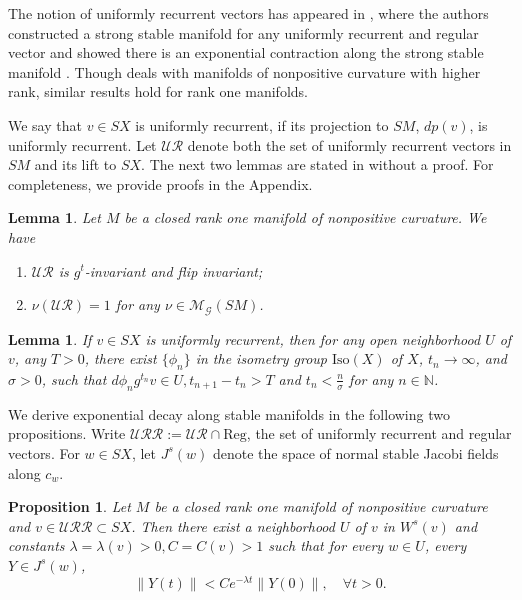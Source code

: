 \documentclass[11pt]{amsart}
\newtheorem{lemma}[theorem]{Lemma}
\newtheorem{proposition}[theorem]{Proposition}
\theoremstyle{definition}
\newcommand{\GGG}{\mathcal{G}}
\def\M{{\mathcal M}}
\newcommand{\UR}{\mathcal{UR}}
\newcommand{\URR}{\mathcal{URR}}
\def\NN{{\mathbb N}}
\begin{document}
The notion of uniformly recurrent vectors has appeared in \cite{BBE}, where the authors constructed a strong stable manifold for any uniformly recurrent and regular vector and showed there is an exponential contraction along the strong stable manifold \cite[Proposition 3.10]{BBE}. Though \cite{BBE} deals with manifolds of nonpositive curvature with higher rank, similar results hold for rank one manifolds.

We say that $v\in SX$ is uniformly recurrent, if its projection to $SM$, $dp(v)$, is uniformly recurrent. Let $\UR$ denote both the set of uniformly recurrent vectors in $SM$ and its lift to $SX$. The next two lemmas are stated in \cite[p. 192]{BBE} without a proof. For completeness, we provide proofs in the Appendix.

\begin{lemma}\label{uniformrec}
Let $M$ be a closed rank one manifold of nonpositive curvature. We have
\begin{enumerate}
  \item $\UR$ is $g^t$-invariant and flip invariant;
  \item $\nu(\UR)=1$ for any $\nu\in \M_{\GGG}(SM)$.
\end{enumerate}
\end{lemma}

\begin{lemma}\label{recrate}
If $v\in SX$ is uniformly recurrent, then for any open neighborhood $U$ of $v$, any $T>0$, there exist $\{\phi_n\}$ in the isometry group $\text{Iso}(X)$ of $X$, $t_n\to \infty$, and $\sigma>0$, such that $d\phi_ng^{t_n}v\in U, t_{n+1}-t_n>T$ and $t_n<\frac{n}{\sigma}$ for any $n\in \NN$.
\end{lemma}

We derive exponential decay along stable manifolds in the following two propositions. Write $\URR:=\UR\cap \text{Reg}$, the set of uniformly recurrent and regular vectors. For $w\in SX$, let $J^s(w)$ denote the space of normal stable Jacobi fields along $c_w$.
\begin{proposition}\label{rate}
Let $M$ be a closed rank one manifold of nonpositive curvature and $v\in \URR\subset SX$. Then there exist a neighborhood $U$ of $v$ in $W^s(v)$ and constants $\lambda=\lambda(v)>0, C=C(v)>1$ such that for every $w\in U$, every $Y\in J^s(w)$,
\begin{equation}\label{jacobi}
\|Y(t)\|< Ce^{-\lambda t}\|Y(0)\|, \quad \forall t>0.
\end{equation}
\end{proposition}
\end{document}
